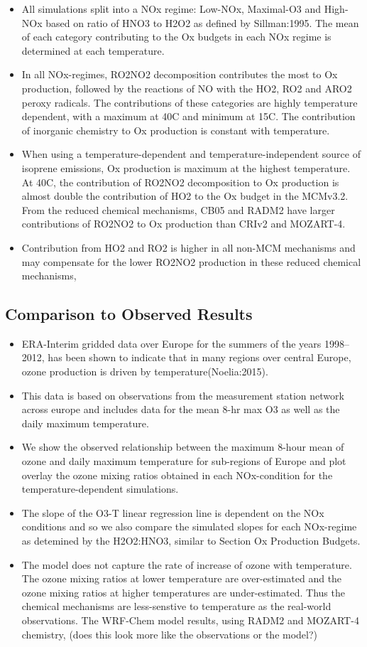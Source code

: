 \documentclass[11pt,a4paper]{article}
\begin{document}
\begin{itemize}
    \item All simulations split into a NOx regime: Low-NOx, Maximal-O3 and High-NOx based on ratio of HNO3 to H2O2 as defined by Sillman:1995. The mean of each category contributing to the Ox budgets in each NOx regime is determined at each temperature.
    \item In all NOx-regimes, RO2NO2 decomposition contributes the most to Ox production, followed by the reactions of NO with the HO2, RO2 and ARO2 peroxy radicals. The contributions of these categories are highly temperature dependent, with a maximum at 40C and minimum at 15C. The contribution of inorganic chemistry to Ox production is constant with temperature.
    \item When using a temperature-dependent and temperature-independent source of isoprene emissions, Ox production is maximum at the highest temperature. At 40C, the contribution of RO2NO2 decomposition to Ox production is almost double the contribution of HO2 to the Ox budget in the MCMv3.2. From the reduced chemical mechanisms, CB05 and RADM2 have larger contributions of RO2NO2 to Ox production than CRIv2 and MOZART-4.
    \item Contribution from HO2 and RO2 is higher in all non-MCM mechanisms and may compensate for the lower RO2NO2 production in these reduced chemical mechanisms, 
\end{itemize}

\subsection{Comparison to Observed Results}
\begin{itemize}
    \item ERA-Interim gridded data over Europe for the summers of the years 1998--2012, has been shown to indicate that in many regions over central Europe, ozone production is driven by temperature(Noelia:2015).
    \item This data is based on observations from the measurement station network across europe and includes data for the mean 8-hr max O3 as well as the daily maximum temperature.
    \item We show the observed relationship between the maximum 8-hour mean of ozone and daily maximum temperature for sub-regions of Europe and plot overlay the ozone mixing ratios obtained in each NOx-condition for the temperature-dependent simulations.
    \item The slope of the O3-T linear regression line is dependent on the NOx conditions and so we also compare the simulated slopes for each NOx-regime as detemined by the H2O2:HNO3, similar to Section Ox Production Budgets.
    \item The model does not capture the rate of increase of ozone with temperature. The ozone mixing ratios at lower temperature are over-estimated and the ozone mixing ratios at higher temperatures are under-estimated. Thus the chemical mechanisms are less-senstive to temperature as the real-world observations. The WRF-Chem model results, using RADM2 and MOZART-4 chemistry, (does this look more like the observations or the model?)
\end{itemize}
\end{document}
